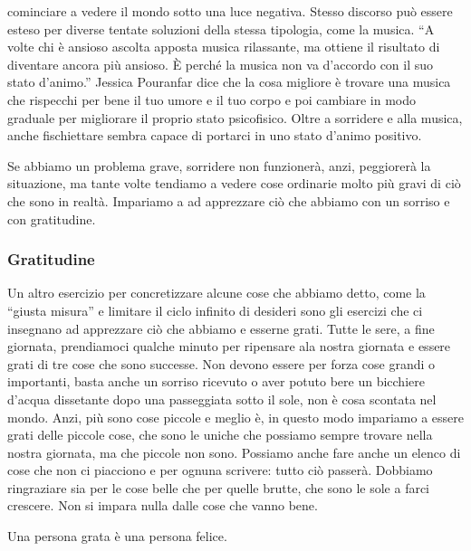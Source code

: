 \documentclass[12pt]{book} %
\begin{document}
cominciare a vedere il mondo sotto una luce negativa. Stesso discorso può essere esteso per diverse tentate soluzioni
della stessa tipologia, come la musica. “A volte chi è ansioso ascolta apposta musica rilassante, ma ottiene il
risultato di diventare ancora più ansioso. È perché la musica non va d'accordo con il suo stato
d'animo.” Jessica Pouranfar dice che la cosa migliore è trovare una musica che rispecchi per bene
il tuo umore e il tuo corpo e poi cambiare in modo graduale per migliorare il proprio stato
psicofisico. 
Oltre a sorridere e alla musica, anche fischiettare sembra capace di portarci in uno stato d'animo positivo.

Se abbiamo un problema grave, sorridere non funzionerà, anzi, peggiorerà la situazione, ma tante volte tendiamo a vedere
cose ordinarie molto più gravi di ciò che sono in realtà. Impariamo a ad apprezzare ciò che abbiamo con un sorriso e
con gratitudine.

\subsubsection{Gratitudine}
Un altro esercizio per concretizzare alcune cose che abbiamo detto, come la “giusta misura” e limitare il ciclo infinito
di desideri sono gli esercizi che ci insegnano ad apprezzare ciò che abbiamo e esserne grati. Tutte le sere, a fine
giornata, prendiamoci qualche minuto per ripensare ala nostra giornata e essere grati di tre cose che sono successe.
Non devono essere per forza cose grandi o importanti, basta anche un sorriso ricevuto o aver potuto bere un bicchiere
d'acqua dissetante dopo una passeggiata sotto il sole, non è cosa scontata nel mondo. Anzi, più
sono cose piccole e meglio è, in questo modo impariamo a essere grati delle piccole cose, che sono le uniche che
possiamo sempre trovare nella nostra giornata, ma che piccole non sono. Possiamo anche fare anche un elenco di cose che
non ci piacciono e per ognuna scrivere: tutto ciò passerà. Dobbiamo ringraziare sia per le cose belle che per quelle
brutte, che sono le sole a farci crescere. Non si impara nulla dalle cose che vanno bene. 

Una persona grata è una persona felice. 
\end{document}
